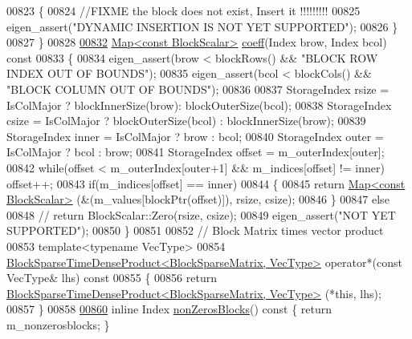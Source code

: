\begin{DoxyCode}
00823       \{
00824         \textcolor{comment}{//FIXME the block does not exist, Insert it !!!!!!!!!}
00825         eigen\_assert(\textcolor{stringliteral}{"DYNAMIC INSERTION IS NOT YET SUPPORTED"});
00826       \}
00827     \}
00828 
\hyperlink{group___sparse_core___module_aa6f4ffb07a0ef2863e7a933676a46abf}{00832}     \hyperlink{group___core___module_class_eigen_1_1_map}{Map<const BlockScalar>} \hyperlink{group___sparse_core___module_aa6f4ffb07a0ef2863e7a933676a46abf}{coeff}(Index brow, Index bcol)\textcolor{keyword}{ const}
00833 \textcolor{keyword}{    }\{
00834       eigen\_assert(brow < blockRows() && \textcolor{stringliteral}{"BLOCK ROW INDEX OUT OF BOUNDS"});
00835       eigen\_assert(bcol < blockCols() && \textcolor{stringliteral}{"BLOCK COLUMN OUT OF BOUNDS"});
00836 
00837       StorageIndex rsize = IsColMajor ? blockInnerSize(brow): blockOuterSize(bcol);
00838       StorageIndex csize = IsColMajor ? blockOuterSize(bcol) : blockInnerSize(brow);
00839       StorageIndex inner = IsColMajor ? brow : bcol;
00840       StorageIndex outer = IsColMajor ? bcol : brow;
00841       StorageIndex offset = m\_outerIndex[outer];
00842       \textcolor{keywordflow}{while}(offset < m\_outerIndex[outer+1] && m\_indices[offset] != inner) offset++;
00843       \textcolor{keywordflow}{if}(m\_indices[offset] == inner)
00844       \{
00845         \textcolor{keywordflow}{return} \hyperlink{group___core___module_class_eigen_1_1_map}{Map<const BlockScalar>} (&(m\_values[blockPtr(offset)]), rsize, csize);
00846       \}
00847       \textcolor{keywordflow}{else}
00848 \textcolor{comment}{//        return BlockScalar::Zero(rsize, csize);}
00849         eigen\_assert(\textcolor{stringliteral}{"NOT YET SUPPORTED"});
00850     \}
00851 
00852     \textcolor{comment}{// Block Matrix times vector product}
00853     \textcolor{keyword}{template}<\textcolor{keyword}{typename} VecType>
00854     \hyperlink{class_eigen_1_1_block_sparse_time_dense_product}{BlockSparseTimeDenseProduct<BlockSparseMatrix, VecType>}
       operator*(\textcolor{keyword}{const} VecType& lhs)\textcolor{keyword}{ const}
00855 \textcolor{keyword}{    }\{
00856       \textcolor{keywordflow}{return} \hyperlink{class_eigen_1_1_block_sparse_time_dense_product}{BlockSparseTimeDenseProduct<BlockSparseMatrix, VecType>}
      (*\textcolor{keyword}{this}, lhs);
00857     \}
00858 
\hyperlink{group___sparse_core___module_a83d5af142c851196a2178bf9ec532d8c}{00860}     \textcolor{keyword}{inline} Index \hyperlink{group___sparse_core___module_a83d5af142c851196a2178bf9ec532d8c}{nonZerosBlocks}()\textcolor{keyword}{ const }\{ \textcolor{keywordflow}{return} m\_nonzerosblocks; \}

\end{DoxyCode}
